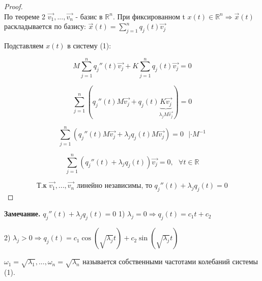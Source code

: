 \documentclass[12pt, a4paper]{report}
\begin{document}
\begin{proof}
    \[  \] 
    По теореме 2 \( \vec{v_1},..., \vec{v_n }   \)  - базис в \( \mathbb{R} ^ n \). При фиксированном t \( x(t ) \in  \mathbb{R}^{n} \Rightarrow \vec{x } (t)  \)  раскладывается по базису: \( \vec{x } (t) = \sum_{j=1} ^{n } q_j (t)\vec{v_j}  \) 

    Подставляем \( x(t) \)  в систему (1): 

    \[ M \sum_{j =1}^n q_j '' (t ) \vec{v_j} + K \sum_{j =1}^n q_j (t ) \vec{v_j} = 0  \] 

    \[ \sum_{j=1}^ n \left( q_j '' (t ) M \vec{v_j } + q_j (t )\underbrace{ K \vec{v_j } }_{\lambda_j M \vec{v_j } } \right) =0\] 

    \[ \sum _{j=1}^ n \left( q_j '' (t ) M \vec{v_j } + \lambda_j q_j (t )M\vec{v_j }  \right) = 0 \text{ }  | \cdot  M^{-1}  \] 

    \[ \sum _{j=1}^ n \left( q_j '' (t  ) + \lambda_j q_j (t ) \right) \vec{v_j }= 0 , \text{ }  \forall  t \in  \mathbb{R}   \] 

    \[ \text{Т.к } \vec{v_1 },..., \vec{v_n} \text{ линейно независимы, то }  q_j '' (t ) + \lambda_j q_j (t) =0    \] 


\end{proof}

\begin{center}
    \textbf{Замечание.} \( q_j ''(t ) + \lambda_j q_j (t) = 0 \) 
    1) \( \lambda_j = 0 \Rightarrow q_j (t ) = c_1 t + c_2  \) 

    2) \( \lambda_j > 0 \Rightarrow q_j (t )  = c_1 \cos (\sqrt{\lambda_j} t) + c_2 \sin (\sqrt{\lambda_j} t) \)
\end{center}

\begin{definition}
    \( \omega_1 = \sqrt{\lambda_1},..., \omega_n = \sqrt{\lambda_n} \) называется собственными частотами колебаний системы (1).
\end{definition}


\ifdefined\mainfile
\else
    
\end{document}

